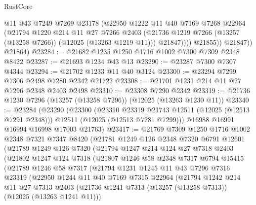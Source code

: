 \begin{lexlean}{RustCore}
\begin{coremodule}
                  @11
                  @43
                  @7249
                  @7269
                  @23178
                  (@22950
                    @1222
                    @11
                    @40
                    @7169
                    @7268
                    @22964
                    (@21794
                      @1220
                      @214
                      @11
                      @27
                      @7266
                      @2403
                      (@21736 @1219 @7266 (@13257 (@13258 @7266)) (@12025 (@13263 @1219 @11)))
                      @21847))))
              @21855))
          @21847))
      @21864)
@23284 := @21682 @1235 @1250 @1716 @1002 @7300 @7309 @2348 @8422
@23287 := @21693 @1234 @43 @13
@23290 := @23287 @7300 @7307 @4344
@23294 := @21702 @1233 @11 @40 @3124
@23300 := @23294 @7299 @7306 @2498 @7280 @2342 @21722
@23308 := @21701 @1231 @214 @11 @27 @7296 @2348 @2403 @2498
@23310 := @23308 @7290 @2342
@23319 := @21736 @1230 @7296 (@13257 (@13258 @7296)) (@12025 (@13263 @1230 @11))
@23340 := @23284
    (@23290
      (@23300
        (@23310 @23319 @21743 @12511 (@12025 (@12513 @7291 @2348)))
        @12511
        (@12025 (@12513 @7281 @7299)))
      @16988
      @16991
      @16994
      @16998
      @17003
      @21763)
@23417 := @21769
    @7309
    @1250
    @1716
    @1002
    @2348
    @7321
    @7347
    @8420
    (@21781
      @1249
      @126
      @2348
      @7320
      @6791
      @12601
      (@21789
        @1249
        @126
        @7320
        (@21794
          @1247
          @214
          @124
          @27
          @7318
          @2403
          (@21802
            @1247
            @124
            @7318
            (@21807
              @1246
              @58
              @2348
              @7317
              @6794
              @15415
              (@21789
                @1246
                @58
                @7317
                (@21794
                  @1231
                  @1245
                  @11
                  @43
                  @7296
                  @7316
                  @23319
                  (@22950
                    @1244
                    @11
                    @40
                    @7169
                    @7315
                    @22964
                    (@21794
                      @1242
                      @214
                      @11
                      @27
                      @7313
                      @2403
                      (@21736 @1241 @7313 (@13257 (@13258 @7313)) (@12025 (@13263 @1241 @11)))

\end{coremodule}
\end{lexlean}
